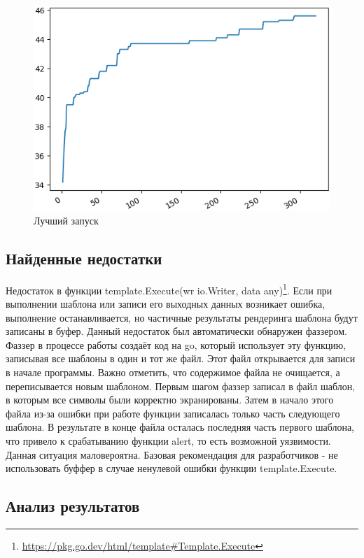 \documentclass[a4paper]{article}
\begin{document}
\begin{figure}[ht!]
    \includegraphics[width=170mm]{BestRun.png}
    \caption{Лучший запуск}
    \label{BestRun}
    \end{figure}

\subsection{Найденные недостатки}

Недостаток в функции template.Execute(wr io.Writer, data any)\footnote{\href{https://pkg.go.dev/html/template\#Template.Execute}{https://pkg.go.dev/html/template\#Template.Execute}}. Если при выполнении шаблона или записи его выходных данных возникает ошибка, выполнение останавливается, но частичные результаты рендеринга шаблона будут записаны в буфер. Данный недостаток был автоматически обнаружен фаззером. Фаззер в процессе работы создаёт код на go, который использует эту функцию, записывая все шаблоны в один и тот же файл. Этот файл открывается для записи в начале программы. Важно отметить, что содержимое файла не очищается, а  переписывается новым шаблоном. Первым шагом фаззер записал в файл шаблон, в которым все символы были корректно экранированы. Затем в начало этого файла из-за ошибки при работе функции записалась только часть следующего шаблона. В результате в конце файла осталась последняя часть первого шаблона, что привело к срабатыванию функции alert, то есть возможной уязвимости. Данная ситуация маловероятна. Базовая рекомендация для разработчиков - не использовать буффер в случае ненулевой ошибки функции template.Execute.

\subsection{Анализ результатов}
\end{document}
